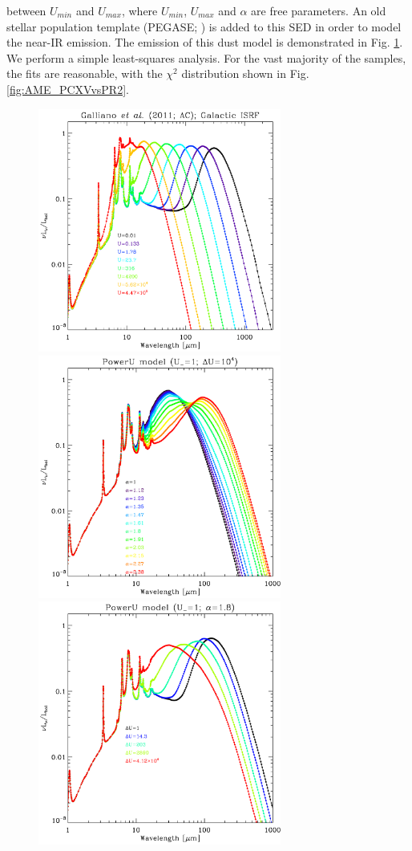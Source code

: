 \documentclass[preprint2,longabstract]{aastex}
\begin{document}
    between $U_{min}$ and $U_{max}$, where $U_{min}$, $U_{max}$ and $\alpha{}$ are free parameters. An old stellar population template (PEGASE; \citep{fioc97}) is added to this SED in order to model the near-IR emission. The emission of this dust model is demonstrated in Fig. \ref{fig:galliano11_templates}. We perform a simple least-squares analysis. For the vast majority of the samples, the fits are reasonable, with the $\chi{}^{2}$ distribution shown in Fig. \ref{fig:AME_PCXVvsPR2}.
\begin{figure}
  \label{fig:galliano11_templates}
  \includegraphics[width=80mm]{../Plots/template_deltaU_G11_AC.pdf}
  \includegraphics[width=80mm]{../Plots/template_powerU_alpha_G11_AC.pdf}
  \includegraphics[width=80mm]{../Plots/template_powerU_DU_G11_AC.pdf}

\end{figure}
\end{document}
